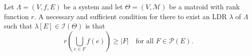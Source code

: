 Let $\Lambda = (V, f, E)$ be a system and let $\Theta = (V, \mathcal{M})$ be a matroid with rank function $r$. A necessary and sufficient condition for there to exist an LDR $\lambda$ of $\Lambda$ such that $\lambda[E] \in \mathcal{I}(\Theta)$ is that
$$r\!\left(\bigcup_{e \in F} f(e)\right) \geq |F| \quad \text{for all } F \in \mathcal{P}(E).$$
